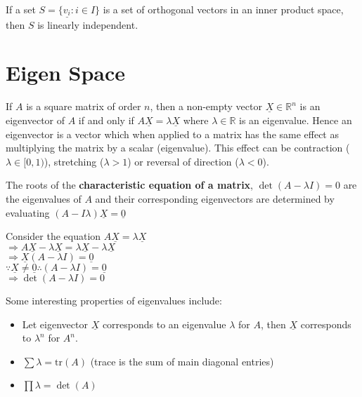 \documentclass{article}
\begin{document}
If a set $S = \{\underline{v_i}: i \in I\}$ is a set of orthogonal vectors in an inner product space, then $S$ is linearly independent.

\section{Eigen Space}

If $A$ is a square matrix of order $n$, then a non-empty vector $\underline{X} \in \mathbb{R}^n$ is an eigenvector of $A$ if and only if $A\underline{X} = \lambda \underline{X}$ where $\lambda \in \mathbb{R}$ is an eigenvalue. Hence an eigenvector is a vector which when applied to a matrix has the same effect as multiplying the matrix by a scalar (eigenvalue). This effect can be contraction ($\lambda \in [0,1)$), stretching ($\lambda > 1$) or reversal of direction ($\lambda < 0$).

The roots of the \textbf{characteristic equation of a matrix}, $\det(A - \lambda I) = 0$ are the eigenvalues of $A$ and their corresponding eigenvectors are determined by evaluating $(A-I\lambda)\underline{X} = \underline{0}$

\begin{tcolorbox}[colback=lightgray!20, colframe=lightgray!20, fontupper=\linespread{1.2}\selectfont]
	Consider the equation $A\underline{X} = \lambda \underline{X}$ \\
	$\Rightarrow A\underline{X} - \lambda\underline{X} = \lambda\underline{X} - \lambda\underline{X}$ \\
	$\Rightarrow \underline{X}(A - \lambda I) = \underline{0}$ \\
	$\because \underline{X} \not= \underline{0} \therefore (A - \lambda I) = \underline{0}$ \\
	$\Rightarrow \det(A - \lambda I) = 0$
\end{tcolorbox}

Some interesting properties of eigenvalues include:
\begin{itemize}
	\item Let eigenvector $\underline{X}$ corresponds to an eigenvalue $\lambda$ for $A$, then $\underline{X}$ corresponds to $\lambda^n$ for $A^n$.
	\item $\sum \lambda = \text{tr}(A)$ (trace is the sum of main diagonal entries)
	\item $\prod \lambda = \det(A)$
\end{itemize}
\end{document}
